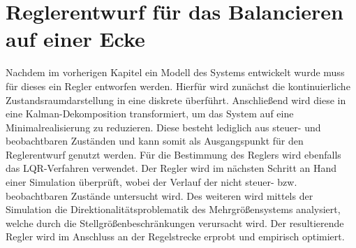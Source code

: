 \ifx\FORMAT\undefined


\fi

\chapter{Reglerentwurf für das Balancieren auf einer Ecke}
Nachdem im vorherigen Kapitel ein Modell des Systems entwickelt wurde muss für dieses ein Regler entworfen werden. Hierfür wird zunächst die kontinuierliche Zustandsraumdarstellung in eine diskrete überführt. Anschließend wird diese in eine Kalman-Dekomposition transformiert, um das System auf eine Minimalrealisierung zu reduzieren. Diese besteht lediglich aus steuer- und beobachtbaren Zuständen und kann somit als Ausgangspunkt für den Reglerentwurf genutzt werden. Für die Bestimmung des Reglers wird ebenfalls das LQR-Verfahren verwendet. Der Regler wird im nächsten Schritt an Hand einer Simulation überprüft, wobei der Verlauf der nicht steuer- bzw. beobachtbaren Zustände untersucht wird. Des weiteren wird mittels der Simulation die Direktionalitätsproblematik des Mehrgrößensystems analysiert, welche durch die Stellgrößenbeschränkungen verursacht wird. Der resultierende Regler wird im Anschluss an der Regelstrecke erprobt und empirisch optimiert.

\newpage

\newpage

\newpage


\ifx\FORMAT\undefined

\fi
